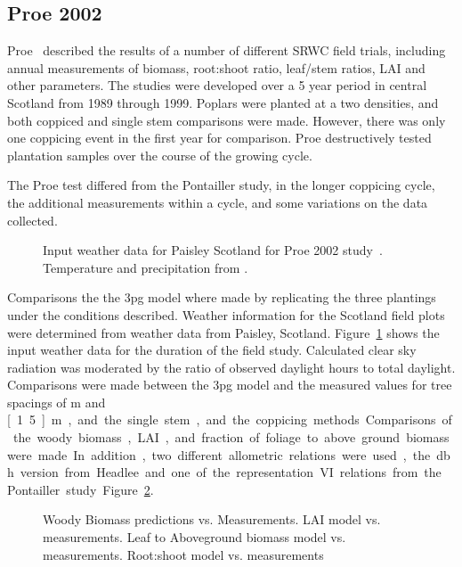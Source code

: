 \documentclass[10pt]{article}
\begin{document}
\subsection*{Proe 2002}

Proe~\cite{Proe2002} described the results of a number of different \ac{SRWC}
field trials, including annual measurements of biomass, root:shoot ratio,
leaf/stem ratios, \ac{LAI} and other parameters.  The studies were developed
over a 5 year period in central Scotland from 1989 through 1999. Poplars were
planted at a two densities, and both coppiced and single stem comparisons were
made.  However, there was only one coppicing event in the first year for
comparison.  Proe destructively tested plantation samples over the course of the
growing cycle.

The Proe test differed from the Pontailler study, in the longer coppicing cycle,
the additional measurements within a cycle, and some variations on the data
collected.


\begin{figure}
  \centering
  
  \caption{Input weather data for Paisley Scotland for Proe 2002
    study~\cite{Proe2002}.  Temperature and precipitation from
    \cite{}.}
  \label{fig:proe-weather}
\end{figure}

Comparisons the the \ac{3pg} model where made by replicating the three plantings
under the conditions described.  Weather information for the Scotland field
plots were determined from weather data from Paisley, Scotland.
Figure~\ref{fig:proe-weather} shows the input weather data for the duration of
the field study.  Calculated clear sky radiation was moderated by the ratio of
observed daylight hours to total daylight.  Comparisons were made between the
\ac{3pg} model and the measured values for tree spacings of \unit[1]{m} and
\unit[1.5]{m}, and the single stem, and the coppicing methods.  Comparisons of
the woody biomass, \ac{LAI}, and fraction of foliage to above ground biomass
were made.  In addition, two different allometric relations were used, the
\ac{dbh} version from Headlee and one of the representation \ac{VI} relations
from the Pontailler study~Figure~\ref{fig:proe-wood}.

\begin{figure}
  \centering
  
  \caption{Woody Biomass predictions vs. Measurements.  \ac{LAI} model vs. measurements. Leaf to Aboveground biomass model vs. measurements. Root:shoot model vs. measurements}
  \label{fig:proe-wood}
\end{figure}
\end{document}
